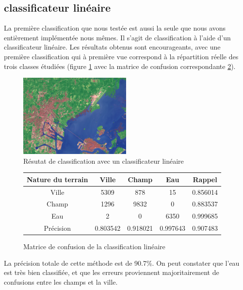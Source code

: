 \documentclass[a4paper,10pt]{article}
\begin{document}
\subsection{classificateur linéaire}
\label{lineaire}
La première classification que nous testée est aussi la seule que nous avons entièrement implémentée nous mêmes. Il s'agit de classification à l'aide d'un classificateur linéaire. Les résultats obtenus sont encourageants, avec une première classification qui à première vue correspond à la répartition réelle des trois classes étudiées (figure \ref{fig:veniseLSE} avec la matrice de confusion correspondante \ref{table:confknn}).

\begin{figure}
  \centering
    \includegraphics[width=0.5\textwidth]{veniseLSE}
  \caption{Résutat de classification avec un classificateur linéaire}
  \label{fig:veniseLSE}
\end{figure}

\begin{figure}
\begin{center}
 \begin{tabular}{|c|c|c|c|c|}
  \hline
  Nature du terrain & Ville & Champ & Eau & Rappel \\
  \hline
Ville & 5309   &   878    &   15 & 0.856014 \\
Champ & 1296   &  9832     &   0  & 0.883537 \\
Eau &  2   &     0  &   6350 & 0.999685 \\
Précision & 0.803542  & 0.918021 & 0.997643 & 0.907483 \\
  \hline
\end{tabular}
\end{center}
\caption{Matrice de confusion de la classification linéaire}
\label{table:confknn}
\end{figure}

La précision totale de cette méthode est de 90.7\%. On peut constater que l'eau est très bien classifiée, et que les erreurs proviennent majoritairement de confusions entre les champs et la ville.
\end{document}
